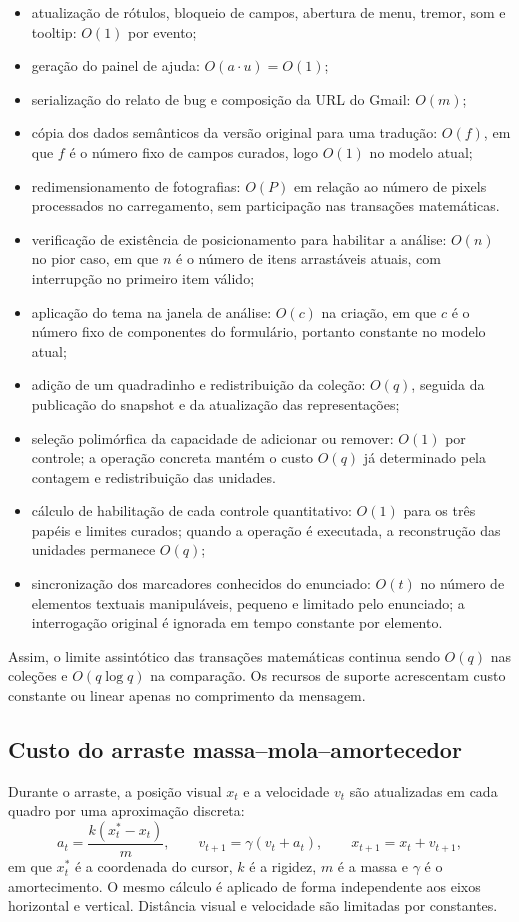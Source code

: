 \documentclass[12pt,a4paper]{article}
\begin{document}
\begin{itemize}[noitemsep]
  \item atualização de rótulos, bloqueio de campos, abertura de menu, tremor, som e tooltip: $O(1)$ por evento;
  \item geração do painel de ajuda: $O(a\cdot u)=O(1)$;
  \item serialização do relato de bug e composição da URL do Gmail: $O(m)$;
  \item cópia dos dados semânticos da versão original para uma tradução: $O(f)$, em que $f$ é o número fixo de campos curados, logo $O(1)$ no modelo atual;
  \item redimensionamento de fotografias: $O(P)$ em relação ao número de pixels processados no carregamento, sem participação nas transações matemáticas.
  \item verificação de existência de posicionamento para habilitar a análise: $O(n)$ no pior caso, em que $n$ é o número de itens arrastáveis atuais, com interrupção no primeiro item válido;
  \item aplicação do tema na janela de análise: $O(c)$ na criação, em que $c$ é o número fixo de componentes do formulário, portanto constante no modelo atual;
  \item adição de um quadradinho e redistribuição da coleção: $O(q)$, seguida da publicação do snapshot e da atualização das representações;
  \item seleção polimórfica da capacidade de adicionar ou remover: $O(1)$ por controle; a operação concreta mantém o custo $O(q)$ já determinado pela contagem e redistribuição das unidades.
  \item cálculo de habilitação de cada controle quantitativo: $O(1)$ para os três papéis e limites curados; quando a operação é executada, a reconstrução das unidades permanece $O(q)$;
  \item sincronização dos marcadores conhecidos do enunciado: $O(t)$ no número de elementos textuais manipuláveis, pequeno e limitado pelo enunciado; a interrogação original é ignorada em tempo constante por elemento.
\end{itemize}

Assim, o limite assintótico das transações matemáticas continua sendo $O(q)$ nas coleções e $O(q\log q)$ na comparação. Os recursos de suporte acrescentam custo constante ou linear apenas no comprimento da mensagem.

\subsection{Custo do arraste massa--mola--amortecedor}
Durante o arraste, a posição visual $x_t$ e a velocidade $v_t$ são atualizadas em cada quadro por uma aproximação discreta:
\[
a_t = \frac{k(x^{*}_t-x_t)}{m},
\qquad
v_{t+1}=\gamma(v_t+a_t),
\qquad
x_{t+1}=x_t+v_{t+1},
\]
em que $x^{*}_t$ é a coordenada do cursor, $k$ é a rigidez, $m$ é a massa e $\gamma$ é o amortecimento. O mesmo cálculo é aplicado de forma independente aos eixos horizontal e vertical. Distância visual e velocidade são limitadas por constantes.
\end{document}
